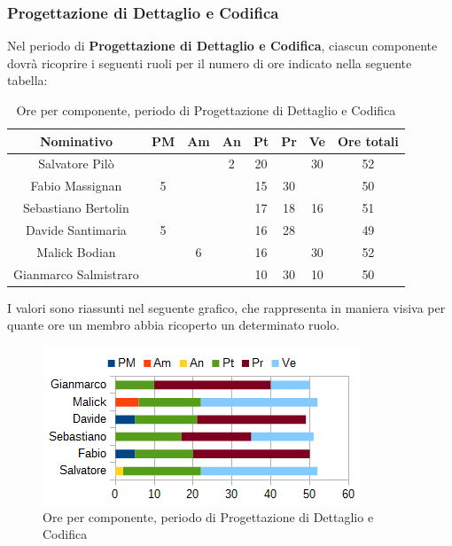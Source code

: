 		\subsubsection{Progettazione di Dettaglio e Codifica}
		Nel periodo di \textbf{Progettazione di Dettaglio e Codifica}, ciascun componente dovrà ricoprire i seguenti ruoli per il numero di ore indicato nella seguente tabella: \\
		\begin{table}[H]
		\centering
		\begin{tabular}{|c|c|c|c|c|c|c|c|}
			\hline
			\textbf{Nominativo}		& \textbf{PM}	& \textbf{Am}	& \textbf{An}	& \textbf{Pt}	& \textbf{Pr}	& \textbf{Ve}	& \textbf{Ore totali}     \\
			\hline
			Salvatore Pilò			& 		& 		& 2		& 20	&		& 30	& 52 \\
			Fabio Massignan			& 5		& 		&		& 15	& 30	& 		& 50 \\
			Sebastiano Bertolin		&		& 		& 		& 17	& 18	& 16	& 51 \\
			Davide Santimaria		& 5		& 		& 		& 16	& 28	&		& 49 \\
			Malick Bodian			& 		& 6		&		& 16	&		& 30	& 52 \\
			Gianmarco Salmistraro	&		& 		& 		& 10	& 30	& 10	& 50 \\
			\hline
		\end{tabular}
		\caption{Ore per componente, periodo di Progettazione di Dettaglio e Codifica}
		\end{table}
		I valori sono riassunti nel seguente grafico, che rappresenta in maniera visiva per quante ore un membro abbia ricoperto un determinato ruolo. \\
		\begin{figure}[H]
			\centering
			\includegraphics[scale=1]{immagini/grafici/progettazione_dettaglio_codifica-barra.png}
			\caption{Ore per componente, periodo di Progettazione di Dettaglio e Codifica}
		\end{figure}
